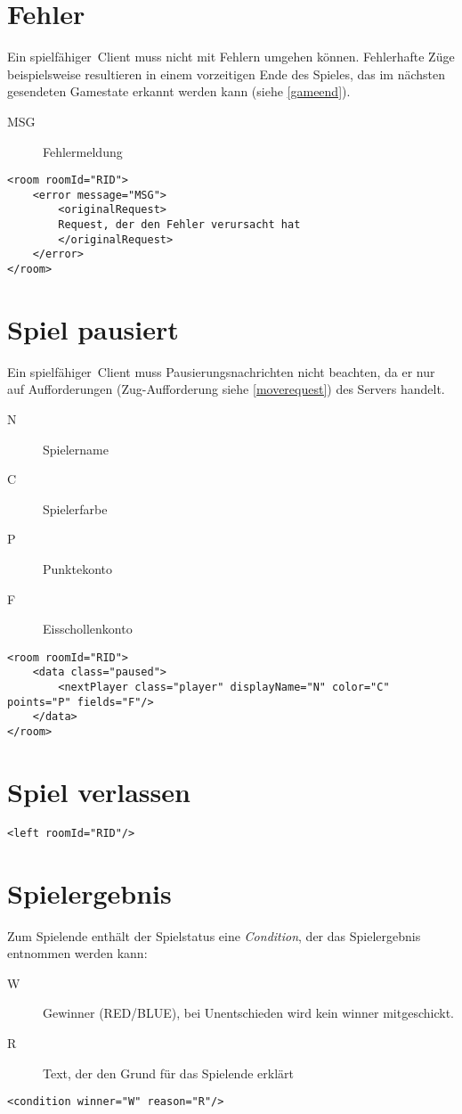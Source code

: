 \documentclass[12pt,a4paper, ngerman, oneside]{scrartcl}
\begin{document}
\section{Fehler}
Ein \glqq spielfähiger\grqq\ Client muss nicht mit Fehlern umgehen können.
Fehlerhafte Züge beispielsweise resultieren in einem vorzeitigen Ende des
Spieles, das im nächsten gesendeten Gamestate erkannt werden kann (siehe \ref{gameend}).
\begin{description}
\item[MSG] Fehlermeldung
\end{description}
\begin{verbatim}
<room roomId="RID">
	<error message="MSG">
		<originalRequest>
		Request, der den Fehler verursacht hat
		</originalRequest>
	</error>
</room>
\end{verbatim}

\section{Spiel pausiert}
Ein \glqq spielfähiger\grqq\ Client muss Pausierungsnachrichten nicht beachten,
da er nur auf Aufforderungen (Zug-Aufforderung siehe \ref{moverequest}) des Servers handelt.
\begin{description}
\item[N] Spielername
\item[C] Spielerfarbe
\item[P] Punktekonto
\item[F] Eisschollenkonto
\end{description}
\begin{verbatim}
<room roomId="RID">
	<data class="paused">
		<nextPlayer class="player" displayName="N" color="C" points="P" fields="F"/>
	</data>
</room>
\end{verbatim}

\section{Spiel verlassen}
\begin{verbatim}
<left roomId="RID"/>
\end{verbatim}


\section{\label{gameend}Spielergebnis}
Zum Spielende enthält der Spielstatus eine \textit{Condition}, der das Spielergebnis entnommen werden kann:
\begin{description}
\item[W] Gewinner (RED/BLUE), bei Unentschieden wird kein winner mitgeschickt.
\item[R] Text, der den Grund für das Spielende erklärt
\end{description}
\begin{verbatim}
<condition winner="W" reason="R"/>
\end{verbatim}
\end{document}
